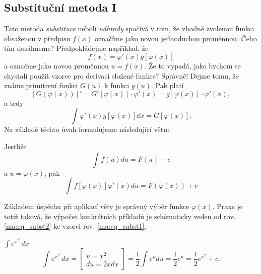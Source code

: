     \subsection{Substituční metoda I}
      Tato metoda \emph{substituce} neboli \emph{náhrady} spočívá v tom, že vhodně zvolenou funkci
      obsaženou v předpisu \(f(x)\) označíme jako novou jednoduchou proměnnou. Čeho tím dosáhneme?
      Předpokládejme například, že \[f(x)=\varphi'(x)g[\varphi(x)]\] a označme jako novou proměnnou
      \(u = f(x)\). Že to vypadá, jako bychom se chystali použít vzorec pro derivaci složené funkce?
      Správně! Dejme tomu, že známe primitivní funkci \(G(u)\) k funkci \(g(u)\). Pak platí
      \begin{equation*}
        \left[G\left(\varphi(x)\right)\right]' = G'\left[\varphi(x)\right]\cdot\varphi'(x) 
        = g\left[\varphi(x)\right]\cdot\varphi'(x),     
      \end{equation*}
      a tedy
      \begin{equation*}
        \int \varphi'(x) g\left[\varphi(x)\right]\dd{x} =  G\left[\varphi(x)\right]. 
      \end{equation*}      
      Na základě těchto úvah formulujeme následující větu:
      \begin{lemma}
        Jestliže
        \begin{equation}\label{ma:eq_subst1}
          \int{f(u)du}=F(u)+c
        \end{equation}
        a $u=\varphi(x)$, pak
        \begin{equation}\label{ma:eq_subst2}
            \int{f[\varphi(x)]\varphi'(x)du}=F(\varphi(x))+c
        \end{equation}
      \end{lemma}
  
      Základem úspěchu při aplikací věty je správný výběr funkce $\varphi(x)$. Praxe je totiž
      taková, že výpočet konkrétních příkladů je schématicky veden od rov. \ref{ma:eq_subst2} ke
      vzorci rov. \ref{ma:eq_subst1}.

      
      
      \begin{example}\label{ma:ex_sub_metoda}$\displaystyle\int{e^{x^{x^2}}dx}$
        \begin{equation*}
            \int{e^{x^{x^2}}dx}=
               \left[
                 \begin{array}{c}u=x^2 \\ du=2xdx\end{array}
               \right]=
               \frac{1}{2}\int{e^udu}=\frac{1}{2}e^u=\frac{1}{2}e^{x^2} + c.
        \end{equation*}
      \end{example}
      
